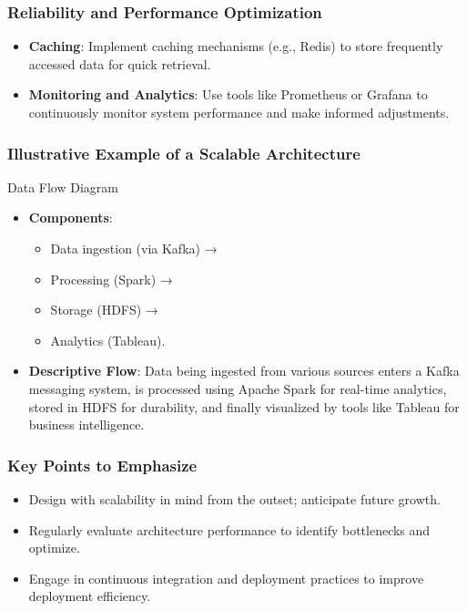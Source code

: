 \documentclass{beamer}
\begin{document}
\begin{frame}[fragile]
    \frametitle{Reliability and Performance Optimization}
    \begin{itemize}
        \item \textbf{Caching}: Implement caching mechanisms (e.g., Redis) to store frequently accessed data for quick retrieval.
        \item \textbf{Monitoring and Analytics}: Use tools like Prometheus or Grafana to continuously monitor system performance and make informed adjustments.
    \end{itemize}
\end{frame}

\begin{frame}[fragile]
    \frametitle{Illustrative Example of a Scalable Architecture}
    \begin{block}{Data Flow Diagram}
        \begin{itemize}
            \item \textbf{Components}:
            \begin{itemize}
                \item Data ingestion (via Kafka) → 
                \item Processing (Spark) → 
                \item Storage (HDFS) → 
                \item Analytics (Tableau).
            \end{itemize}
            \item \textbf{Descriptive Flow}: Data being ingested from various sources enters a Kafka messaging system, is processed using Apache Spark for real-time analytics, stored in HDFS for durability, and finally visualized by tools like Tableau for business intelligence.
        \end{itemize}
    \end{block}
\end{frame}

\begin{frame}[fragile]
    \frametitle{Key Points to Emphasize}
    \begin{itemize}
        \item Design with scalability in mind from the outset; anticipate future growth.
        \item Regularly evaluate architecture performance to identify bottlenecks and optimize.
        \item Engage in continuous integration and deployment practices to improve deployment efficiency.
    \end{itemize}
\end{frame}
\end{document}
